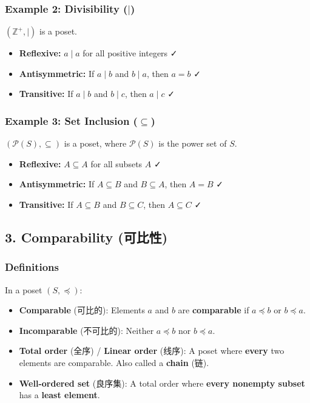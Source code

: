 \documentclass[10pt,a4paper,openany]{ctexbook}
\theoremstyle{definition}
\theoremstyle{remark}
\begin{document}
\subsubsection{Example 2: Divisibility ($\mid$)}

$(\mathbb{Z}^+, \mid)$ is a poset.
\begin{itemize}
\item \textbf{Reflexive:} $a \mid a$ for all positive integers ✓
\item \textbf{Antisymmetric:} If $a \mid b$ and $b \mid a$, then $a = b$ ✓
\item \textbf{Transitive:} If $a \mid b$ and $b \mid c$, then $a \mid c$ ✓

\end{itemize}

\subsubsection{Example 3: Set Inclusion ($\subseteq$)}

$(\mathcal{P}(S), \subseteq)$ is a poset, where $\mathcal{P}(S)$ is the power set of $S$.
\begin{itemize}
\item \textbf{Reflexive:} $A \subseteq A$ for all subsets $A$ ✓
\item \textbf{Antisymmetric:} If $A \subseteq B$ and $B \subseteq A$, then $A = B$ ✓
\item \textbf{Transitive:} If $A \subseteq B$ and $B \subseteq C$, then $A \subseteq C$ ✓

\end{itemize}

\vspace{-2pt}

\subsection{3. Comparability (可比性)}

\subsubsection{Definitions}

In a poset $(S, \preccurlyeq)$:
\begin{itemize}
\item \textbf{Comparable} (可比的): Elements $a$ and $b$ are \textbf{comparable} if $a \preccurlyeq b$ or $b \preccurlyeq a$.
\item \textbf{Incomparable} (不可比的): Neither $a \preccurlyeq b$ nor $b \preccurlyeq a$.
\item \textbf{Total order} (全序) / \textbf{Linear order} (线序): A poset where \textbf{every} two elements are comparable. Also called a \textbf{chain} (链).
\item \textbf{Well-ordered set} (良序集): A total order where \textbf{every nonempty subset} has a \textbf{least element}.

\end{itemize}
\end{document}
